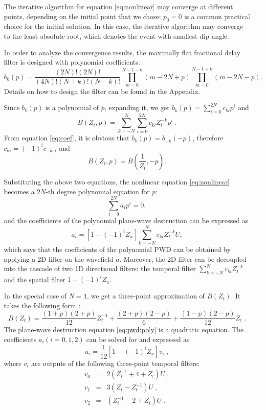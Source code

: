 The iterative algorithm for equation \ref{eq:nonlinear}
may converge at different points,
depending on the initial point that we chose;
$p_0=0$ is a common practical choice for the initial solution.
In this case, 
the iterative algorithm may converge to the least absolute root, 
which denotes the event with smallest dip angle.

In order to analyze the convergence results,
the maximally flat fractional delay filter 
\cite[]{thiran1971recursive,zhang2009maxflat}
is designed with polynomial coefficients:
\begin{equation}\label{eq:coef}
b_k(p)=
\frac{(2N)!(2N)!}{(4N)!(N+k)!(N-k)!}
\prod_{m=0}^{N-1-k}(m-2N+p)
\prod_{m=0}^{N-1+k}(m-2N-p).
\end{equation}
Details on how to design the filter can be found in the Appendix.


Since $b_k(p)$ is a polynomial of $p$,
expanding it, we get $b_k(p)=\displaystyle{\sum_{i=0}^{2N}c_{ki}p^i}$ and 
\begin{equation}
B(Z_t,p)=\sum_{k=-N}^N\sum_{i=0}^{2N}c_{ki}Z_t^{-k}p^i\;.
\end{equation}
From equation \ref{eq:coef}, it is obvious that $b_k(p)=b_{-k}(-p)$, 
therefore
$c_{ki}=(-1)^ic_{-k,i}$ and
\begin{equation}
B(Z_t,p)=B(\frac{1}{Z_t},-p).
\end{equation}

Substituting the above two equations,
the nonlinear equation \ref{eq:nonlinear} 
becomes a $2N$-th degree polynomial equation for $p$:
\begin{equation}\label{eq:pwd:poly}
\sum_{i=0}^{2N}a_ip^i=0,
\end{equation}
and the coefficients of the polynomial plane-wave destruction
can be expressed as
\begin{equation}
a_i=[1-(-1)^iZ_x]\sum_{k=-N}^Nc_{ki}Z_t^{-k}U,
\end{equation}
which says that the coefficients of the polynomial PWD
can be obtained by applying a 2D filter on the wavefield $u$.
Moreover, the 2D filter can be decoupled into the cascade of
two 1D directional filters:
the temporal filter $\displaystyle{\sum_{k=-N}^Nc_{ki}Z_t^{-k}}$ 
and the spatial filter $1-(-1)^iZ_x$.

In the special case of $N=1$,
we get a three-point approximation of $B(Z_t)$.
It takes the following form \cite[]{fomel:1946}: 
\begin{equation}
B(Z_t) = \frac{(1+p)(2+p)}{12}Z_t^{-1}+\frac{(2+p)(2-p)}{6}
+\frac{(1-p)(2-p)}{12}Z_t\;.
\end{equation}
The plane-wave destruction equation \ref{eq:pwd:poly} is a quadratic equation. 
The coefficients $a_i(i=0,1,2)$ can be solved for and expressed as
\begin{equation}
a_i=\frac{1}{12}[1-(-1)^iZ_x]v_i\;,
\end{equation}
where $v_i$ are outputs of the following three-point temporal filters:
\begin{eqnarray}
\label{eq:temp30}
v_0 &=& 2(Z_t^{-1}+4+Z_t)U\;, \\
v_1 &=& 3(Z_t-Z_t^{-1})U\;, \\
\label{eq:temp32}
v_2 &=& (Z_t^{-1}-2+Z_t)U\;.
\end{eqnarray}


